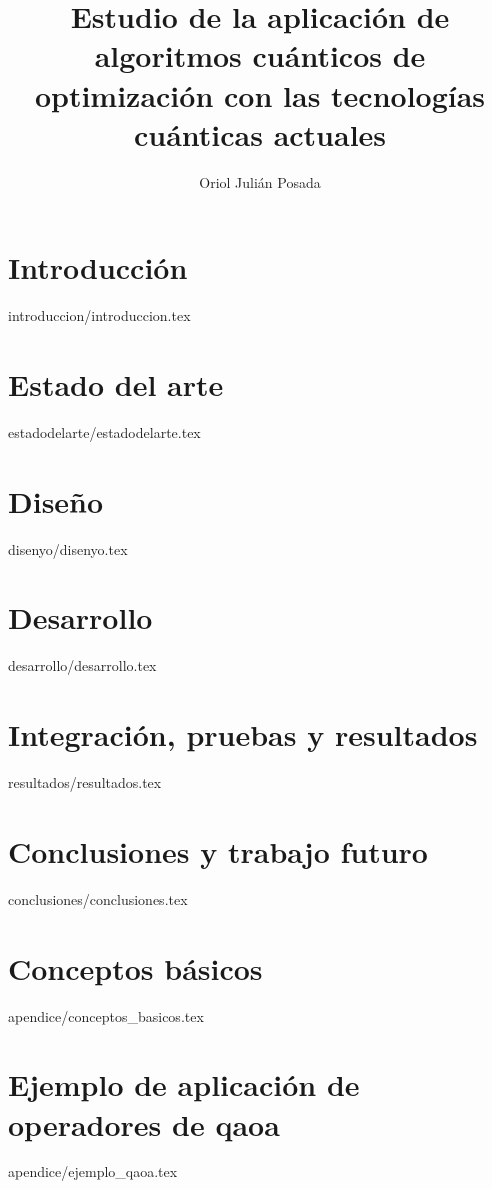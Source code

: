 \documentclass[epsbased,copyright,final,printable,covers,extendedindex,firstnumbered,tfg,lof,lot]{tfgtfmthesisuam}
\title[Aplicación de algoritmos cuánticos de optimización con las tecnologías cuánticas actuales]{Estudio de la aplicación de algoritmos cuánticos de optimización con las tecnologías cuánticas actuales}
\author{Oriol Julián Posada}
\begin{document}
\chapter{Introducción\label{cap:introduccion}}{introduccion/introduccion.tex}

\chapter{Estado del arte\label{CAP:ESTADODELARTE}}{estadodelarte/estadodelarte.tex}

\chapter{Diseño\label{CAP:DISEÑO}}{disenyo/disenyo.tex}

\chapter{Desarrollo\label{CAP:DESARROLLO}}{desarrollo/desarrollo.tex}

\chapter{Integración, pruebas y resultados\label{CAP:RESULTADOS}}{resultados/resultados.tex}

\chapter{Conclusiones y trabajo futuro\label{CAP:CONCLUSIONES}}{conclusiones/conclusiones.tex}



\newpage
{}




\appendix

\chapter{Conceptos básicos}{apendice/conceptos_basicos.tex}
\chapter{Ejemplo de aplicación de operadores de qaoa\label{CAP:EJEMPLO_QAOA}}{apendice/ejemplo_qaoa.tex}
\end{document}
